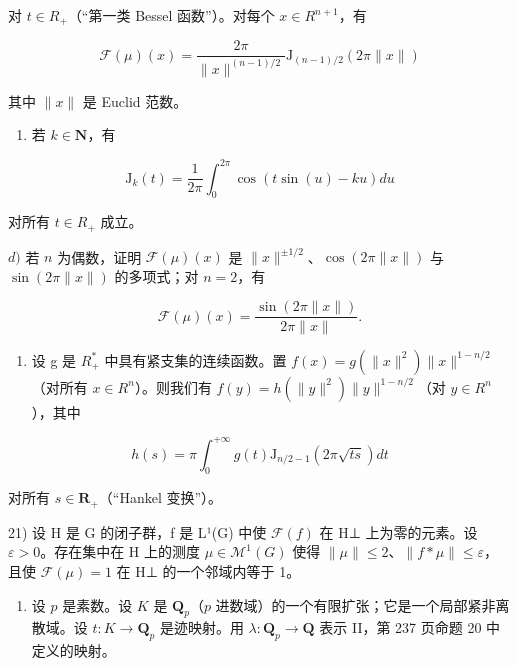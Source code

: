 对 \(t \in R_{+}\)（“第一类 Bessel 函数”）。对每个 \(x \in R^{n+1}\)，有

\[
\mathcal {F} (\mu) (x) = \frac {2 \pi}{\| x \| ^ {(n - 1) / 2}} \mathrm{J} _ {(n - 1) / 2} (2 \pi \| x \|)
\]

其中 \(\|x\|\) 是 Euclid 范数。

\begin{enumerate}
\def\labelenumi{\alph{enumi})}
\setcounter{enumi}{2}
\tightlist
\item
  若 \(k\in \mathbf{N}\)，有
\end{enumerate}

\[
\mathrm{J} _ {k} (t) = \frac {1}{2 \pi} \int_ {0} ^ {2 \pi} \cos (t \sin (u) - k u) d u
\]

对所有 \(t \in R_{+}\) 成立。

\(d)\) 若 \(n\) 为偶数，证明 \(\mathcal{F}(\mu)(x)\) 是 \(\| x\|^{\pm 1/2}\)、\(\cos(2\pi \| x\|)\) 与 \(\sin(2\pi \| x\|)\) 的多项式；对 \(n=2\)，有

\[
\mathcal {F} (\mu) (x) = \frac {\sin (2 \pi \| x \|)}{2 \pi \| x \|}.
\]

\begin{enumerate}
\def\labelenumi{\alph{enumi})}
\setcounter{enumi}{4}
\tightlist
\item
  设 g 是 \(R_{+}^{*}\) 中具有紧支集的连续函数。置 \(f(x) = g(\|x\|^{2}) \|x\|^{1-n/2}\)（对所有 \(x \in R^{n}\)）。则我们有 \(\widehat{f}(y) = h(\|y\|^{2}) \|y\|^{1-n/2}\)（对 \(y \in R^{n}\)），其中
\end{enumerate}

\[
h (s) = \pi \int_ {0} ^ {+ \infty} g (t) \mathrm{J} _ {n / 2 - 1} (2 \pi \sqrt {t s}) d t
\]

对所有 \(s \in \mathbf{R}_{+}\)（“Hankel 变换”）。

21) 设 H 是 G 的闭子群，f 是 L¹(G) 中使 \(\mathcal{F}(f)\) 在 H⊥ 上为零的元素。设 \(\varepsilon > 0\)。存在集中在 H 上的测度 \(\mu \in \mathcal{M}^1(G)\) 使得 \(\| \mu \| \leqslant 2\)、\(\| f * \mu \| \leqslant \varepsilon\)，且使 \(\mathcal{F}(\mu) = 1\) 在 H⊥ 的一个邻域内等于 1。

\begin{enumerate}
\def\labelenumi{\arabic{enumi})}
\setcounter{enumi}{21}
\tightlist
\item
  设 \(p\) 是素数。设 \(K\) 是 \(\mathbf{Q}_p\)（\(p\) 进数域）的一个有限扩张；它是一个局部紧非离散域。设 \(t: K \to \mathbf{Q}_p\) 是迹映射。用 \(\lambda: \mathbf{Q}_p \to \mathbf{Q}\) 表示 II，第 237 页命题 20 中定义的映射。
\end{enumerate}


